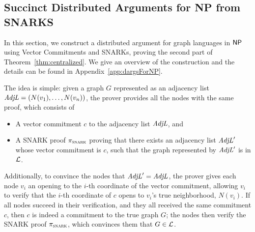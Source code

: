 \subsection{Succinct Distributed Arguments for NP from SNARKS}\label{sec:dargsForNP}
In this section, we construct a distributed argument for graph languages in ${\mathsf{NP}}$ using Vector Commitments and SNARKs,
proving the second part of Theorem~\ref{thm:centralized}.
We give an overview of the construction and the details
can be found in Appendix~\ref{app:dargsForNP}.


The idea is simple:
given a graph $G$ represented as an adjacency list $\mathit{ AdjL } = (N(v_1),\ldots,N(v_n))$,
the prover provides all the nodes with the same proof, which consists of
\begin{itemize}
	\item A vector commitment $c$ to the adjacency list $\mathit{ AdjL }$, and
        \item A SNARK proof $\pi_\textsc{snark}$ proving that there exists an adjacency list $\mathit{ AdjL }'$ whose vector commitment is $c$, such that the graph represented by $\mathit{ AdjL }'$ is in $\mathcal{L}$.
\end{itemize}
Additionally, to convince the nodes that $\mathit{ AdjL }' = \mathit{ AdjL }$,
the prover gives each node $v_i$ an opening to the $i$-th coordinate of the vector commitment, allowing $v_i$ to verify that the $i$-th coordinate of $c$ opens to $v_i$'s true neighborhood, $N(v_i)$.
If all nodes succeed in their verification, and they all received the same commitment $c$, then $c$ is indeed a commitment to the true graph $G$; the nodes then verify the SNARK proof $\pi_\textsc{snark}$, which convinces them that $G \in \mathcal{L}$.

